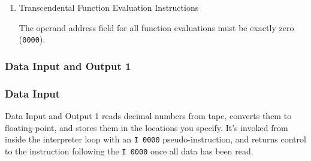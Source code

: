 \begin{enumerate}
\item Transcendental Function Evaluation Instructions

The operand address field for all function evaluations must be exactly zero (\texttt{0000}).
\end{enumerate}

\subsubsection*{Data Input and Output 1}
\label{subsec:data_io_1}

\subsubsection*{Data Input}
Data Input and Output 1 reads decimal numbers from tape, converts them to floating-point, and stores them in the locations you specify. It's invoked from inside the interpreter loop with an \texttt{I 0000} pseudo-instruction, and returns control to the instruction following the \texttt{I 0000} once all data has been read.

